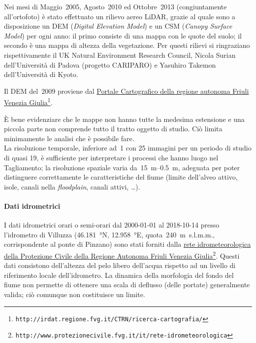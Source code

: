 Nei mesi di Maggio~2005, Agosto~2010 ed Ottobre~2013 (congiuntamente all'ortofoto) è stato effettuato un rilievo aereo LiDAR, grazie al quale sono a disposizione un DEM (\emph{Digital Elevation Model}) e un CSM (\emph{Canopy Surface Model}) per ogni anno: il primo consiste di una mappa con le quote del suolo; il secondo è una mappa di altezza della vegetazione.
Per questi rilievi si ringraziano rispettivamente il UK Natural Environment Research Council, Nicola Surian dell'Università di Padova (progetto CARIPARO) e Yasuhiro Takemon dell'Università di Kyoto.

Il DEM del~2009 proviene dal \href{http://irdat.regione.fvg.it/CTRN/ricerca-cartografia/}{Portale Cartografico della regione autonoma Friuli Venezia Giulia}\footnote{\texttt{http://irdat.regione.fvg.it/CTRN/ricerca-cartografia/}}.

È bene evidenziare che le mappe non hanno tutte la medesima estensione e una piccola parte non comprende tutto il tratto oggetto di studio.
Ciò limita minimamente le analisi che è possibile fare.
\\
La risoluzione temporale, inferiore ad~\SI{1}{\anno} con \num{25} immagini per un periodo di studio di quasi \SI{19}{\anni}, è sufficiente per interpretare i processi che hanno luogo nel Tagliamento; la risoluzione spaziale varia da~\SIrange[range-phrase={ a }]{15}{0.5}{\m}, adeguata per poter distinguere correttamente le caratteristiche del fiume (limite dell'alveo attivo, isole, canali nella \emph{floodplain}, canali attivi, \ldots).

\paragraph{Dati idrometrici}
I dati idrometrici orari o semi-orari dal 2000-01-01 al 2018-10-14 presso l'idrometro di Villuzza (\SI{46.181}{\degree}N, \SI{12.958}{\degree}E, quota~\SI{240}{\m}~s.l.m.m., corrispondente al ponte di Pinzano) sono stati forniti dalla \href{http://www.protezionecivile.fvg.it/it/rete-idrometeorologica}{rete idrometeorologica della Protezione Civile della Regione Autonoma Friuli Venezia Giulia}\footnote{\texttt{http://www.protezionecivile.fvg.it/it/rete-idrometeorologica}}.
Questi dati consistono dell'altezza del pelo libero dell'acqua rispetto ad un livello di riferimento locale dell'idrometro.
La dinamica della morfologia del fondo del fiume non permette di ottenere una scala di deflusso (delle portate) generalmente valida; ciò comunque non costituisce un limite.

